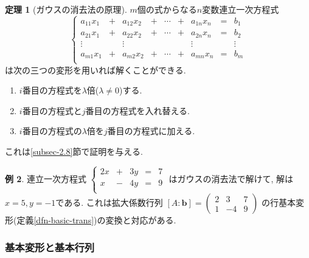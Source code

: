 \documentclass[dvipdfmx,a4paper,11pt]{article}
\theoremstyle{definition}
\newtheorem{thm}{定理}
\newtheorem{exa}[thm]{例}
\begin{document}
 \begin{tcolorbox}[
    colback = white,
    colframe = green!35!black,
    fonttitle = \bfseries,
    breakable = true]
    \begin{thm}[ガウスの消去法の原理]
 \label{thm-gauss}
$m$個の式からなる$n$変数連立一次方程式
\begin{equation*}
\left\{ 
\begin{matrix}
a_{11}x_1&+& a_{12} x_2& +&\cdots &+&a_{1n}x_n &= &b_1 \\
a_{21}x_1&+& a_{22} x_2& +&\cdots &+&a_{2n}x_n &= &b_2 \\
\vdots		&& 	\vdots				 && 		& &\vdots&&\vdots	\\
a_{m1}x_1&+& a_{m2} x_2& +&\cdots &+&a_{mn}x_n &= &b_m \\
\end{matrix}
\right.
\end{equation*}
は次の三つの変形を用いれば解くことができる.
 \begin{enumerate}
   \setlength{\parskip}{0cm} 
  \setlength{\itemsep}{0cm}
  \item $i$番目の方程式を$\lambda$倍($\lambda\neq 0$)する.
 \item $i$番目の方程式と$j$番目の方程式を入れ替える.
 \item $i$番目の方程式の$\lambda$倍を$j$番目の方程式に加える. 
 \end{enumerate}
  \end{thm}
 \end{tcolorbox}
これは\ref{subsec-2.8}節で証明を与える.
 
 
 \begin{exa}
 連立一次方程式
 $
 \left\{ 
\begin{matrix}
2x&+&3y& = &7 \\
x&-&4y& = &9 \\
\end{matrix}
\right.
 $
 はガウスの消去法で解けて, 解は$x = 5, y=-1$である. 
これは拡大係数行列
 $[A : \bm{b}] = 
  \begin{pmatrix}
 2 & 3  &7\\
 1 & -4 &9
 \end{pmatrix}
 $
の行基本変形(定義\ref{dfn-basic-trans})の変換と対応がある. 
 \end{exa}


 \subsubsection{基本変形と基本行列}
 
\end{document}
